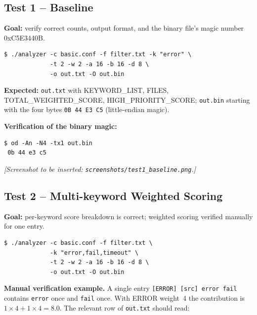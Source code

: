 \documentclass[11pt,a4paper]{article}
\newcommand{\code}[1]{\texttt{\small #1}}
\begin{document}
\subsection{Test 1 -- Baseline}
\label{sec:test1}

\textbf{Goal:} verify correct counts, output format, and the binary
file's magic number 0xC5E3440B.

\begin{lstlisting}[style=Bashstyle]
$ ./analyzer -c basic.conf -f filter.txt -k "error" \
             -t 2 -w 2 -a 16 -b 16 -d 8 \
             -o out.txt -O out.bin
\end{lstlisting}

\textbf{Expected:} \code{out.txt} with KEYWORD\_LIST, FILES,
TOTAL\_WEIGHTED\_SCORE, HIGH\_PRIORITY\_SCORE; \code{out.bin} starting
with the four bytes \code{0B 44 E3 C5} (little-endian magic).

\textbf{Verification of the binary magic:}
\begin{lstlisting}[style=Bashstyle]
$ od -An -N4 -tx1 out.bin
 0b 44 e3 c5
\end{lstlisting}


\noindent
\textit{[Screenshot to be inserted: \code{screenshots/test1\_baseline.png}.]}

\subsection{Test 2 -- Multi-keyword Weighted Scoring}

\textbf{Goal:} per-keyword score breakdown is correct; weighted scoring
verified manually for one entry.

\begin{lstlisting}[style=Bashstyle]
$ ./analyzer -c basic.conf -f filter.txt \
             -k "error,fail,timeout" \
             -t 2 -w 2 -a 16 -b 16 -d 8 \
             -o out.txt -O out.bin
\end{lstlisting}

\textbf{Manual verification example.} A single entry
\code{[ERROR] [src] error fail} contains \code{error} once and
\code{fail} once. With ERROR weight~4 the contribution is
$1\!\times\!4 + 1\!\times\!4 = 8.0$. The relevant row of \code{out.txt}
should read:
\end{document}
